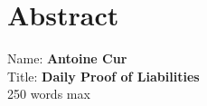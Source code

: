 
\chapter*{Abstract}

Name: 	\tab \textbf{Antoine Cur} \\
Title: 	\tab \textbf{Daily Proof of Liabilities}\\

250 words max


